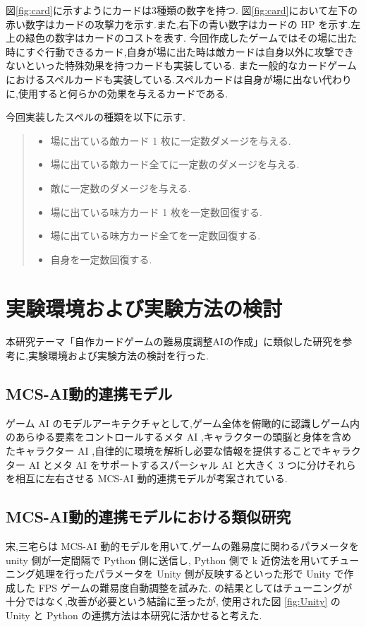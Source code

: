 \documentclass{jarticle}     %
\begin{document}
図\ref{fig:card}に示すようにカードは3種類の数字を持つ.
図\ref{fig:card}において左下の赤い数字はカードの攻撃力を示す.また,右下の青い数字はカードの HP を示す.左上の緑色の数字はカードのコストを表す.
今回作成したゲームではその場に出た時にすぐ行動できるカード,自身が場に出た時は敵カードは自身以外に攻撃できないといった特殊効果を持つカードも実装している.
また一般的なカードゲームにおけるスペルカードも実装している.スペルカードは自身が場に出ない代わりに,使用すると何らかの効果を与えるカードである.
\par
\par
\par
今回実装したスペルの種類を以下に示す.
\begin{quote}
  \begin{itemize}
   \item 場に出ている敵カード 1 枚に一定数ダメージを与える.
   \item 場に出ている敵カード全てに一定数のダメージを与える.
   \item 敵に一定数のダメージを与える.
   \item 場に出ている味方カード 1 枚を一定数回復する.
   \item 場に出ている味方カード全てを一定数回復する.
   \item 自身を一定数回復する.
  \end{itemize}
 \end{quote}



\section{実験環境および実験方法の検討}
本研究テーマ「自作カードゲームの難易度調整AIの作成」に類似した研究を参考に,実験環境および実験方法の検討を行った.

\subsection{MCS-AI動的連携モデル}
ゲーム AI のモデルアーキテクチャとして,ゲーム全体を俯瞰的に認識しゲーム内のあらゆる要素をコントロールするメタ AI ,キャラクターの頭脳と身体を含めたキャラクター AI ,自律的に環境を解析し必要な情報を提供することでキャラクター AI とメタ AI をサポートするスパーシャル AI と大きく 3 つに分けそれらを相互に左右させる MCS-AI 動的連携モデルが考案されている\cite{MCSAIモデル}.


\subsection{MCS-AI動的連携モデルにおける類似研究}
宋,三宅らは MCS-AI 動的モデルを用いて,ゲームの難易度に関わるパラメータを unity 側が一定間隔で Python 側に送信し, Python 側で k 近傍法を用いてチューニング処理を行ったパラメータを Unity 側が反映するといった形で Unity で作成した FPS ゲームの難易度自動調整を試みた\cite{FPS}. \cite{FPS}の結果としてはチューニングが十分ではなく,改善が必要という結論に至ったが, 使用された図 \ref{fig:Unity} のUnity と Python の連携方法は本研究に活かせると考えた.
\end{document}
